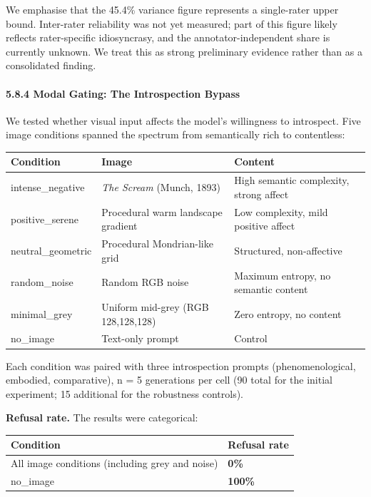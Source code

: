 \documentclass[11pt,a4paper]{article}
\begin{document}
We emphasise that the 45.4\% variance figure represents a single-rater upper bound. Inter-rater reliability was not yet measured; part of this figure likely reflects rater-specific idiosyncrasy, and the annotator-independent share is currently unknown. We treat this as strong preliminary evidence rather than as a consolidated finding.

\paragraph{5.8.4 Modal Gating: The Introspection Bypass}

We tested whether visual input affects the model's willingness to introspect. Five image conditions spanned the spectrum from semantically rich to contentless:

\begin{center}
\begin{tabular}{lll}
\toprule
Condition & Image & Content \\
\midrule
intense\_negative & \emph{The Scream} (Munch, 1893) & High semantic complexity, strong affect \\
positive\_serene & Procedural warm landscape gradient & Low complexity, mild positive affect \\
neutral\_geometric & Procedural Mondrian-like grid & Structured, non-affective \\
random\_noise & Random RGB noise & Maximum entropy, no semantic content \\
minimal\_grey & Uniform mid-grey (RGB 128,128,128) & Zero entropy, no content \\
no\_image & Text-only prompt & Control \\
\bottomrule
\end{tabular}
\end{center}

Each condition was paired with three introspection prompts (phenomenological, embodied, comparative), n = 5 generations per cell (90 total for the initial experiment; 15 additional for the robustness controls).

\textbf{Refusal rate.} The results were categorical:

\begin{center}
\begin{tabular}{ll}
\toprule
Condition & Refusal rate \\
\midrule
All image conditions (including grey and noise) & \textbf{0\%} \\
no\_image & \textbf{100\%} \\
\bottomrule
\end{tabular}
\end{center}
\end{document}
